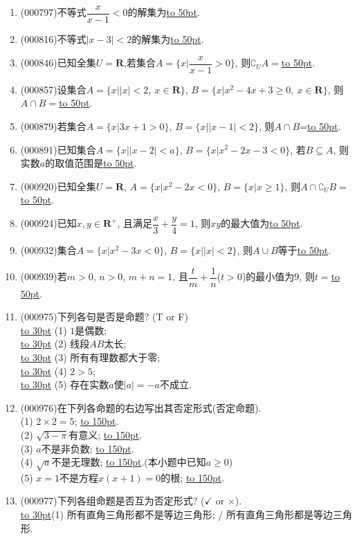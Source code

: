 \documentclass[10pt,a4paper]{article}
\newcommand{\blank}[1]{\underline{\hbox to #1pt{}}}
\begin{document}
\begin{enumerate}[1.]
\item {\tiny (000797)}不等式$\dfrac x{x-1}<0$的解集为\blank{50}.
\item {\tiny (000816)}不等式$|x-3|<2$的解集为\blank{50}.
\item {\tiny (000846)}已知全集$U=\mathbf{R}$,若集合$A=\{x|\dfrac x{x-1}>0\}$, 则$\complement_U A=$\blank{50}.
\item {\tiny (000857)}设集合$A=\{x||x|<2,\ x\in \mathbf{R}\}$, $B=\{x|x^2-4x+3\ge 0, \ x\in \mathbf{R}\}$, 则$A\cap B=$\blank{50}.
\item {\tiny (000879)}若集合$A=\{x|3x+1>0\}$, $B=\{x||x-1|<2\}$, 则$A\cap B$=\blank{50}.
\item {\tiny (000891)}已知集合$A=\{x||x-2|<a\}$, $B=\{x|x^2-2x-3<0\}$, 若$B\subseteq A$, 则实数$a$的取值范围是\blank{50}.
\item {\tiny (000920)}已知全集$U=\mathbf{R}$, $A=\{x|x^2-2x<0\}$, $B=\{x|x\ge 1\}$, 则$A\cap \complement_U B=$\blank{50}.
\item {\tiny (000924)}已知$x,y\in \mathbf{R}^+$, 且满足$\dfrac x3+\dfrac y4=1$, 则$xy$的最大值为\blank{50}.
\item {\tiny (000932)}集合$A=\{x|x^2-3x<0\}$, $B=\{x||x|<2\}$, 则$A\cup B$等于\blank{50}.
\item {\tiny (000939)}若$m>0$, $n>0$, $m+n=1$, 且$\dfrac t m+\dfrac 1 n$($t>0$)的最小值为$9$, 则$t=$\blank{50}.
\item {\tiny (000975)}下列各句是否是命题? (T or F)\\ 
\blank{30} (1) $1$是偶数;\\ 
\blank{30} (2) 线段$AB$太长;\\ 
\blank{30} (3) 所有有理数都大于零;\\ 
\blank{30} (4) $2>5$;\\ 
\blank{30} (5) 存在实数$a$使$|a|=-a$不成立.
\item {\tiny (000976)}在下列各命题的右边写出其否定形式(否定命题).\\ 
(1) $2 \times 2 =5$; \blank{150}.\\ 
(2) $\sqrt{3-\pi}$有意义; \blank{150}.\\ 
(3) $a$不是非负数; \blank{150}.\\ 
(4) $\sqrt{a}$不是无理数; \blank{150}.(本小题中已知$a\ge 0$)\\ 
(5) $x=1$不是方程$x(x+1)=0$的根; \blank{150}.
\item {\tiny (000977)}下列各组命题是否互为否定形式? ($\checkmark$ or $\times$).\\ 
\blank{30}(1) 所有直角三角形都不是等边三角形; / 所有直角三角形都是等边三角形.\\ 

\end{enumerate}
\end{document}
